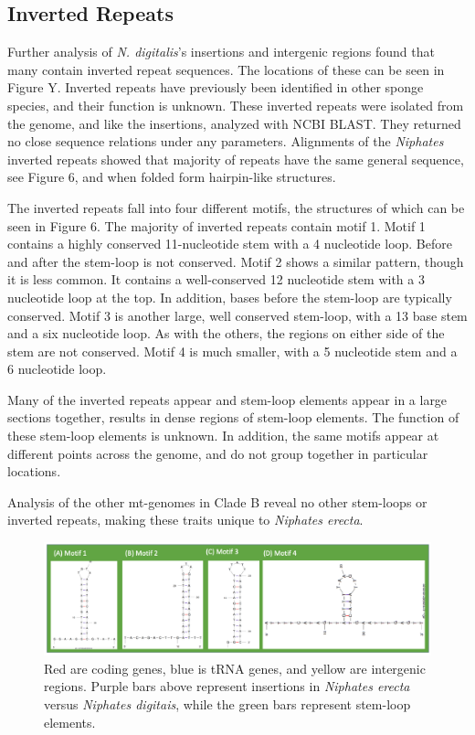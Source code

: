 \documentclass[../main.tex]{subfiles}
\begin{document}
\subsection{Inverted Repeats}

Further analysis of \emph{N. digitalis}'s insertions and intergenic regions found that many contain inverted repeat sequences. The locations of these can be seen in Figure Y. Inverted repeats have previously been identified in other sponge species, and their function is unknown. These inverted repeats were isolated from the genome, and like the insertions, analyzed with NCBI BLAST. They returned no close sequence relations under any parameters. Alignments of the \emph{Niphates} inverted repeats showed that majority of repeats have the same general sequence, see Figure 6, and when folded form hairpin-like structures.

The inverted repeats fall into four different motifs, the structures of which can be seen in Figure 6. The majority of inverted repeats contain motif 1. Motif 1 contains a highly conserved 11-nucleotide stem with a 4 nucleotide loop. Before and after the stem-loop is not conserved. Motif 2 shows a similar pattern, though it is less common. It contains a well-conserved 12 nucleotide stem with a 3 nucleotide loop at the top. In addition, bases before the stem-loop are typically conserved. Motif 3 is another large, well conserved stem-loop, with a 13 base stem and a six nucleotide loop. As with the others, the regions on either side of the stem are not conserved. Motif 4 is much smaller, with a 5 nucleotide stem and a 6 nucleotide loop. 

Many of the inverted repeats appear and stem-loop elements appear in a large sections together, results in dense regions of stem-loop elements. The function of these stem-loop elements is unknown. In addition, the same motifs appear at different points across the genome, and do not group together in particular locations.

Analysis of the other mt-genomes in Clade B reveal no other stem-loops or inverted repeats, making these traits unique to \emph{Niphates erecta}.

\begin{figure}[htp]
    \centering
    \includegraphics[width=1.0\textwidth]{Figures/figure 5.png}
    \caption{Red are coding genes, blue is tRNA genes, and yellow are intergenic regions. Purple bars above represent insertions in \emph{Niphates erecta} versus \emph{Niphates digitais}, while the green bars represent stem-loop elements.}
\end{figure}
\end{document}
